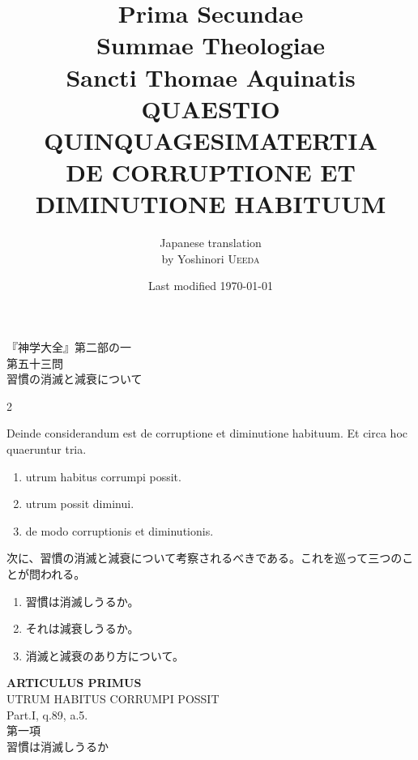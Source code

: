 \documentclass[paper=a4paper,fontsize=10pt,jafontsize=9pt,titlepage]{jlreq}
\title{{\bfseries Prima Secundae}\\{\Huge Summae Theologiae}\\Sancti Thomae
Aquinatis\\{\sffamily QUAESTIO QUINQUAGESIMATERTIA}\\{\bfseries DE CORRUPTIONE ET DIMINUTIONE
HABITUUM}}
\author{Japanese translation\\by Yoshinori {\scshape Ueeda}}
\date{Last modified \today}
\begin{document}
\maketitle
\thispagestyle{empty}
\begin{center}
{\Large 『神学大全』第二部の一\\第五十三問\\習慣の消滅と減衰について}
\end{center}


\begin{paracol}{2}

Deinde considerandum est de corruptione et diminutione habituum. Et circa hoc quaeruntur tria. 



\begin{enumerate}
 \item utrum habitus corrumpi possit.
 \item utrum possit diminui.
 \item de modo corruptionis et diminutionis.
\end{enumerate}

\switchcolumn

次に、習慣の消滅と減衰について考察されるべきである。これを巡って三つのことが問われる。
\begin{enumerate}
 \item 習慣は消滅しうるか。
 \item それは減衰しうるか。
 \item 消滅と減衰のあり方について。
\end{enumerate}

\end{paracol}
\newpage
{}
{}
\setcounter{section}{1}
\setcounter{subsection}{0}

\begin{center}
{\Large {\bfseries ARTICULUS PRIMUS}}\\
{\large UTRUM HABITUS CORRUMPI POSSIT}\\
{\footnotesize Part.I, q.89, a.5.}\\
{\Large 第一項\\習慣は消滅しうるか}
\end{center}
\end{document}
